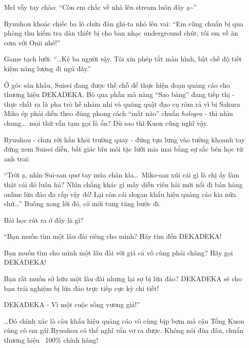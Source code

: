 \documentclass[../main.tex]{subfiles}
\begin{document}
Mel vẫy tay chào: ``Còn em chắc về nhà lên stream luôn đây ạ\~{}''

Ryuuhou khoác chiếc ba lô chứa đàn ghi-ta nhỏ lên vai: ``Em cũng chuẩn bị qua phòng thu kiểm tra dàn thiết bị cho ban nhạc underground chút, tối em về ăn cơm với Onii nhé!''

Game tạch lưỡi: ``\dots Kệ ba người vậy. Tôi xin phép tắt màn hình, bật chế độ tiết kiệm năng lượng đi ngủ đây.''

\ct

Ở góc sân khấu, Suisei đang được thế chỗ để thực hiện đoạn quảng cáo cho thương hiệu DEKADEKA. Bỏ qua phần mà nàng ``Sao băng'' đang tiếp thị - thực chất ra là pha trò hề nhảm nhí và quăng quật đạo cụ rôm rả vì bị Sakura Miko ép phải diễn theo đúng phong cách ``mất não'' chuẩn \textit{hologra} - thì nhìn chung\dots\ mọi thứ vẫn tạm gọi là ổn? Dù sao thì Kuon cũng nghĩ vậy.

Ryuuhou - chưa rời hẳn khỏi trường quay - đứng tựa lưng vào tường khoanh tay đứng xem Suisei diễn, bất giác bĩu môi tặc lưỡi mỉa mai bằng sự sắc bén học từ anh trai:

``Trời ạ, nhìn Sui-san quơ tay múa chân kìa\dots\ Miko-san xúi cái gì là chị ấy làm thật cái đó luôn hả? Nhìn chẳng khác gì mấy diễn viên hài mới nổi đi bán hàng online lừa đảo đa cấp vậy đó! Lại còn cái slogan khẩu hiệu quảng cáo kia nữa chứ\dots'' Buông xong lời đó, cô mới tung tăng bước đi.

Bài học rút ra ở đây là gì?

``Bạn muốn tìm một lâu đài riêng cho mình? Hãy tìm đến DEKADEKA!

Bạn muốn tìm cho mình một lâu đài với giá cả vô cùng phải chăng? Hãy gọi DEKADEKA!

Bạn rất muốn sở hữu một lâu đài nhưng lại sợ bị lừa đảo? DEKADEKA sẽ cho bạn trải nghiệm bị lừa đảo trực tiếp cực kỳ chi tiết!

DEKADEKA - Vì một cuộc sống vương giả!''

\dots Đó chính xác là câu khẩu hiệu quảng cáo vô cùng bịp bợm mà cậu Tổng Kuon cùng cô em gái Ryuuhou có thể nghĩ vẩn vơ ra được. Không nói đùa đâu, chuẩn thương hiệu \hll\ 100\% chính hãng!
\end{document}
